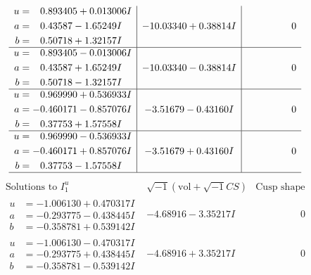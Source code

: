 \documentclass[1p]{elsarticle_modified}
\theoremstyle{definition}
\newcommand{\I}{\sqrt{-1}}
\begin{document}
$$\begin{array}{c|c|c}
\begin{aligned}
u &= \phantom{-}0.893405 + 0.013006 I \\
a &= \phantom{-}0.43587 - 1.65249 I \\
b &= \phantom{-}0.50718 + 1.32157 I\end{aligned}
 & -10.03340 + 0.38814 I & \phantom{-0.000000 } 0 \\ \hline\begin{aligned}
u &= \phantom{-}0.893405 - 0.013006 I \\
a &= \phantom{-}0.43587 + 1.65249 I \\
b &= \phantom{-}0.50718 - 1.32157 I\end{aligned}
 & -10.03340 - 0.38814 I & \phantom{-0.000000 } 0 \\ \hline\begin{aligned}
u &= \phantom{-}0.969990 + 0.536933 I \\
a &= -0.460171 - 0.857076 I \\
b &= \phantom{-}0.37753 + 1.57558 I\end{aligned}
 & -3.51679 - 0.43160 I & \phantom{-0.000000 } 0 \\ \hline\begin{aligned}
u &= \phantom{-}0.969990 - 0.536933 I \\
a &= -0.460171 + 0.857076 I \\
b &= \phantom{-}0.37753 - 1.57558 I\end{aligned}
 & -3.51679 + 0.43160 I & \phantom{-0.000000 } 0\\
 \hline 
 \end{array}$$\newpage$$\begin{array}{c|c|c}  
\text{Solutions to }I^u_{1}& \I (\text{vol} + \sqrt{-1}CS) & \text{Cusp shape}\\
 \hline 
\begin{aligned}
u &= -1.006130 + 0.470317 I \\
a &= -0.293775 - 0.438445 I \\
b &= -0.358781 + 0.539142 I\end{aligned}
 & -4.68916 - 3.35217 I & \phantom{-0.000000 } 0 \\ \hline\begin{aligned}
u &= -1.006130 - 0.470317 I \\
a &= -0.293775 + 0.438445 I \\
b &= -0.358781 - 0.539142 I\end{aligned}
 & -4.68916 + 3.35217 I & \phantom{-0.000000 } 0 \\ \hline\begin{aligned}

\end{aligned}
\end{array}$$
\end{document}
